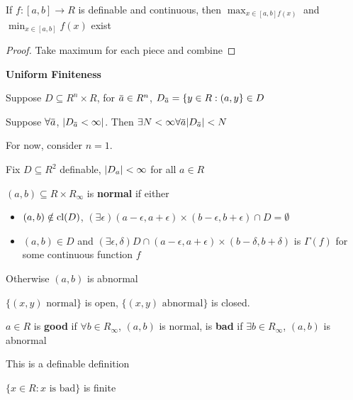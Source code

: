 \documentclass[11pt]{article}
\begin{document}
\begin{corollary}[]
If \(f:[a,b]\to R\) is definable and continuous, then \(\max_{x\in[a,b]f(x)}\)
and \(\min_{x\in[a,b]}f(x)\) exist
\end{corollary}

\begin{proof}
Take maximum for each piece and combine
\end{proof}

\textbf{Uniform Finiteness}

Suppose \(D\subseteq R^n\times R\), for \(\bara\in R^n\), \(D_{\bara}=\{y\in R:(a,y\}\in D\)

\begin{theorem}
Suppose \(\forall\bara\), \(\abs{D_{\bara}<\infty}\). Then \(\exists N<\infty\forall\bara\abs{D_{\bara}}<N\)
\end{theorem}

For now, consider \(n=1\).

Fix \(D\subseteq R^2\) definable, \(\abs{D_a}<\infty\) for all \(a\in R\)

\begin{definition}[]
\((a,b)\subseteq R\times R_{\infty}\) is \textbf{normal} if either
\begin{itemize}
\item \((a,b)\notin\operatorname{\text{cl}}(D)\), \((\exists \epsilon)(a-\epsilon,a+\epsilon)\times(b-\epsilon,b+\epsilon)\cap D=\emptyset\)
\item \((a,b)\in D\) and \((\exists\epsilon,\delta)D\cap(a-\epsilon,a+\epsilon)\times(b-\delta,b+\delta)\) is \(\Gamma(f)\) for some continuous
function \(f\)
\end{itemize}

Otherwise \((a,b)\) is abnormal
\end{definition}

\begin{remark}
\(\{(x,y)\text{ normal}\}\) is open, \(\{(x,y)\text{ abnormal}\}\) is closed.
\end{remark}

\begin{definition}[]
\(a\in R\) is \textbf{good} if \(\forall b\in R_\infty\), \((a,b)\) is normal, is \textbf{bad} if \(\exists b\in R_\infty\), \((a,b)\) is abnormal
\end{definition}

This is a definable definition

\begin{lemma}[]
\(\{x\in R:x\text{ is bad}\}\) is finite
\end{lemma}
\end{document}
